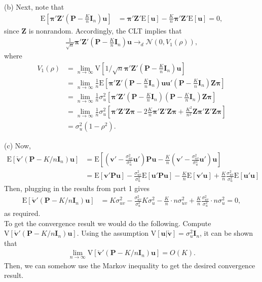 \documentclass[11pt]{article}
\newcommand{\E}{\mathrm{E}}
\newcommand{\V}{\mathrm{V}}
\newcommand{\N}{\mathcal{N}}
\begin{document}
(b)
Next, note that
\begin{align*}
\E[\bm{\pi}'\bm{Z}'(\bm{P} - \frac{K}{n}\bm{I}_n)\bm{u}] &= \bm{\pi}'\bm{Z}'\E[\bm{u}] - \frac{K}{n}\bm{\pi}'\bm{Z}'\E[\bm{u}] = 0,
\end{align*}
since $\bm{Z}$ is nonrandom. Accordingly, the CLT implies that
\begin{align*}
\frac{1}{\sqrt{n}} \bm{\pi}'\bm{Z}'(\bm{P} - \frac{K}{n}\bm{I}_n)\bm{u} \to_d \N(0, V_1(\rho)),
\end{align*}
where
\begin{align*}
V_1(\rho) &= \lim_{n\to \infty} \V[1/\sqrt{n}\bm{\pi}'\bm{Z}'(\bm{P} - \frac{K}{n}\bm{I}_n)\bm{u}]\\
&=\lim_{n\to \infty} \frac{1}{n}\E[\bm{\pi}'\bm{Z}'(\bm{P} - \frac{K}{n}\bm{I}_n)\bm{u}\bm{u}' (\bm{P} - \frac{K}{n}\bm{I}_n)\bm{Z}\bm{\pi}]\\
&=\lim_{n\to \infty} \frac{1}{n} \sigma^2_u \left[ \bm{\pi}'\bm{Z}'(\bm{P} - \frac{K}{n}\bm{I}_n)(\bm{P} - \frac{K}{n}\bm{I}_n)\bm{Z}\bm{\pi}\right]\\
&=\lim_{n\to \infty} \frac{1}{n} \sigma^2_u \left[ \bm{\pi}'\bm{Z}'\bm{Z}\bm{\pi}- 2\frac{K}{n}\bm{\pi}'\bm{Z}'\bm{Z}\bm{\pi} + \frac{K^2}{n^2}\bm{Z}\bm{\pi}'\bm{Z}'\bm{Z}\bm{\pi}\right]\\
&= \sigma^2_u (1-\rho^2).
\end{align*}

(c)
Now,
\begin{align*}
\E[ \check{\bm{v}}'(\bm{P} -K/n\bm{I}_n) \bm{u}] &= \E\left[\left({\bm{v}}' - \frac{\sigma^2_{uv}}{\sigma^2_u}\bm{u}'\right)\bm{P}\bm{u} - \frac{K}{n} \left({\bm{v}}' - \frac{\sigma^2_{uv}}{\sigma^2_u}\bm{u}'\right)\bm{u}\right]\\
&=\E[{\bm{v}}'\bm{P}\bm{u}] - \frac{\sigma^2_{uv}}{\sigma^2_u}\E[\bm{u}'\bm{P}\bm{u}] - \frac{K}{n}\E[\bm{v}'\bm{u}] + \frac{K}{n}\frac{\sigma^2_{uv}}{\sigma^2_u}\E[\bm{u}'\bm{u}]
\end{align*}
Then, plugging in the results from part 1 gives
\begin{align*}
\E[ \check{\bm{v}}'(\bm{P} -K/n\bm{I}_n) \bm{u}] &= K\sigma^2_{uv} - \frac{\sigma^2_{uv}}{\sigma^2_u} K \sigma^2_u - \frac{K}{n} \cdot n \sigma^2_{uv} + \frac{K}{n}\frac{\sigma^2_{uv}}{\sigma^2_u} \cdot n \sigma^2_u = 0,
\end{align*}
as required. \\

To get the convergence result we would do the following. Compute $\V[\check{\bm{v}}'(\bm{P} -K/n\bm{I}_n) \bm{u}]$. Using the assumption $\V[\bm{u}|\check{\bm{v}}] = \sigma^2_u\bm{I}_n$, it can be shown that
\begin{align*}
\lim_{n\to \infty} \V[\check{\bm{v}}'(\bm{P} -K/n\bm{I}_n) \bm{u}] = O(K).
\end{align*}
Then, we can somehow use the Markov inequality to get the desired convergence result.
\end{document}
